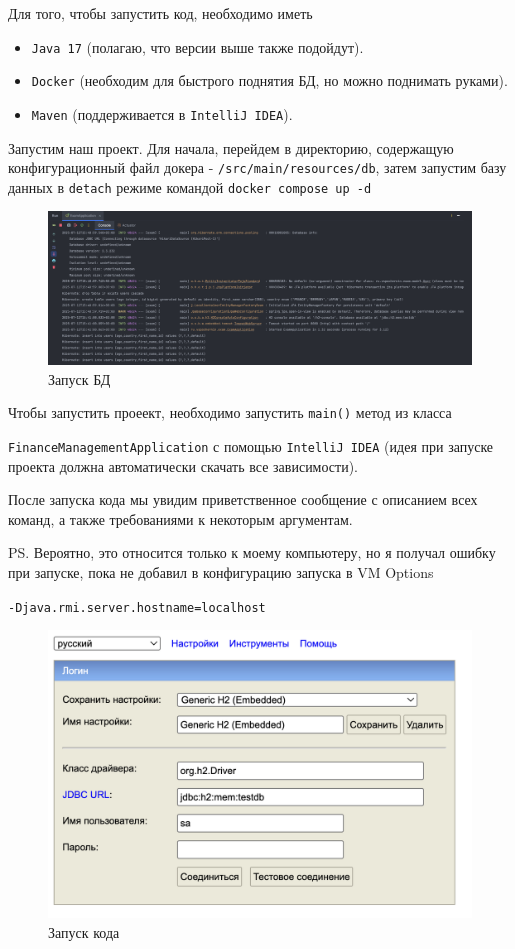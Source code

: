 \documentclass[a4paper, 14pt]{article}
\begin{document}
Для того, чтобы запустить код, необходимо иметь

\begin{itemize}
	\item \texttt{Java 17} (полагаю, что версии выше также подойдут).
	\item \texttt{Docker} (необходим для быстрого поднятия БД, но можно поднимать руками).
	\item \texttt{Maven} (поддерживается в \texttt{IntelliJ IDEA}).
\end{itemize}

Запустим наш проект. Для начала, перейдем в директорию, содержащую конфигурационный файл докера - \texttt{/src/main/resources/db}, затем запустим базу данных в \texttt{detach} режиме командой \texttt{docker compose up -d}

\begin{figure}[H]
	\centering
	\includegraphics[width=17cm]{resources/2.png}
	\caption{Запуск БД}
\end{figure}

Чтобы запустить проеект, необходимо запустить \texttt{main()} метод из класса

\texttt{FinanceManagementApplication} с помощью \texttt{IntelliJ IDEA} (идея при запуске проекта должна автоматически скачать все зависимости).

После запуска кода мы увидим приветственное сообщение с описанием всех команд, а также требованиями к некоторым аргументам.

PS. Вероятно, это относится только к моему компьютеру, но я получал ошибку при запуске, пока не добавил в конфигурацию запуска в VM Options

\texttt{-Djava.rmi.server.hostname=localhost}

\begin{figure}[H]
	\centering
	\includegraphics[width=17cm]{resources/3.png}
	\caption{Запуск кода}
\end{figure}
\end{document}
